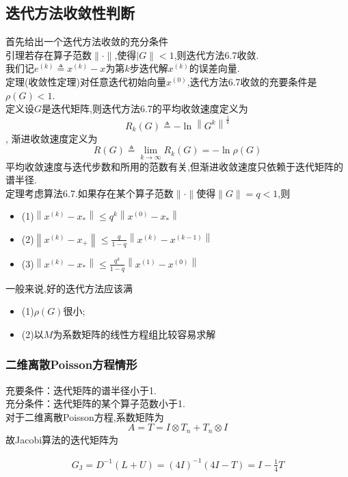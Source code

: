 \documentclass[12pt,a4paper]{article}
\begin{document}
\subsection*{迭代方法收敛性判断}
首先给出一个迭代方法收敛的充分条件\\
{\color{blue}引理}若存在算子范数$\|\cdot\|$,使得$| G \|<1$,则迭代方法6.7收敛.\\
我们记$e^{(k)} \triangleq x^{(k)}-x$为第$k$步迭代解$x^{(k)}$的{\color{blue}误差向量}.\\
{\color{blue}定理(收敛性定理)}对任意迭代初始向量$x^{(0)}$,迭代方法6.7收敛的充要条件是$\rho(G)<1$.\\
{\color{blue}定义}设$G$是迭代矩阵,则迭代方法6.7的{\color{blue}平均收敛速度}定义为
$$
R_{k}(G) \triangleq-\ln \left\|G^{k}\right\|^{\frac{1}{k}}
$$,
{\color{blue}渐进收敛速度}定义为
$$
R(G) \triangleq \lim _{k \rightarrow \infty} R_{k}(G)=-\ln \rho(G)
$$
平均收敛速度与迭代步数和所用的范数有关,但渐进收敛速度只依赖于迭代矩阵的谱半径.\\
{\color{blue}定理}考虑算法6.7.如果存在某个算子范数$\|\cdot\|$使得$\|G\|=q<1$,则
\begin{itemize}
\item (1)$\left\|x^{(k)}-x_{*}\right\| \leq q^{k}\left\|x^{(0)}-x_{*}\right\|$
\item (2)$\left\|x^{(k)}-x_{+}\right\| \leq \frac{q}{1-q}\left\|x^{(k)}-x^{(k-1)}\right\|$
\item (3)$\left\|x^{(k)}-x_{*}\right\| \leq \frac{q^{k}}{1-q}\left\|x^{(1)}-x^{(0)}\right\|$
\end{itemize}
一般来说,好的迭代方法应该满
\begin{itemize}
\item(1)$\rho(G)$很小;
\item(2)以$M$为系数矩阵的线性方程组比较容易求解
\end{itemize}
\subsubsection{二维离散Poisson方程情形}
{\color{blue}充要条件}：迭代矩阵的谱半径小于1.\\
{\color{blue}充分条件}：迭代矩阵的某个算子范数小于1.\\
对于二维离散Poisson方程,系数矩阵为
$$
A=T=I \otimes T_{n}+T_{n} \otimes I
$$
故Jacobi算法的迭代矩阵为

\begin{align*}
G_{\mathrm{J}}=D^{-1}(L+U)=(4 I)^{-1}(4 I-T)=I-\frac{1}{4} T
\tag {6.12}
\end{align*}
\end{document}
